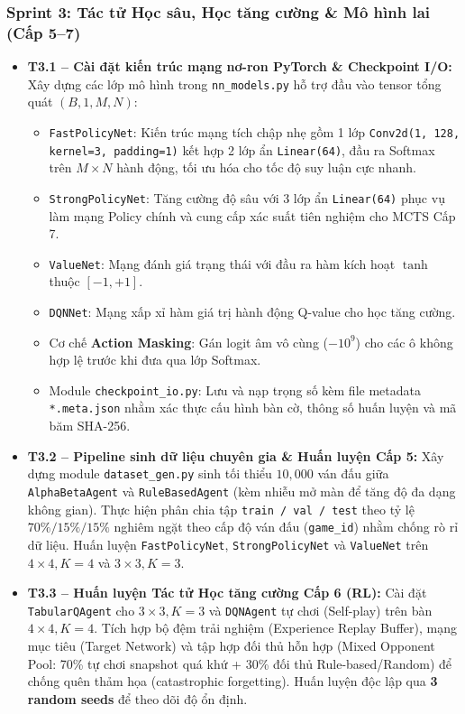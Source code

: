 \documentclass[a4paper,12pt]{report}
\begin{document}
\subsubsection{Sprint 3: Tác tử Học sâu, Học tăng cường \& Mô hình lai (Cấp 5--7)}
\begin{itemize}
    \item \textbf{T3.1 -- Cài đặt kiến trúc mạng nơ-ron PyTorch \& Checkpoint I/O:}
    Xây dựng các lớp mô hình trong \texttt{nn\_models.py} hỗ trợ đầu vào tensor tổng quát $(B, 1, M, N)$:
    \begin{itemize}
        \item \texttt{FastPolicyNet}: Kiến trúc mạng tích chập nhẹ gồm 1 lớp \texttt{Conv2d(1, 128, kernel=3, padding=1)} kết hợp 2 lớp ẩn \texttt{Linear(64)}, đầu ra Softmax trên $M \times N$ hành động, tối ưu hóa cho tốc độ suy luận cực nhanh.
        \item \texttt{StrongPolicyNet}: Tăng cường độ sâu với 3 lớp ẩn \texttt{Linear(64)} phục vụ làm mạng Policy chính và cung cấp xác suất tiên nghiệm cho MCTS Cấp 7.
        \item \texttt{ValueNet}: Mạng đánh giá trạng thái với đầu ra hàm kích hoạt $\tanh$ thuộc $[-1, +1]$.
        \item \texttt{DQNNet}: Mạng xấp xỉ hàm giá trị hành động Q-value cho học tăng cường.
        \item Cơ chế \textbf{Action Masking}: Gán logit âm vô cùng ($-10^9$) cho các ô không hợp lệ trước khi đưa qua lớp Softmax.
        \item Module \texttt{checkpoint\_io.py}: Lưu và nạp trọng số kèm file metadata \texttt{*.meta.json} nhằm xác thực cấu hình bàn cờ, thông số huấn luyện và mã băm SHA-256.
    \end{itemize}
    \item \textbf{T3.2 -- Pipeline sinh dữ liệu chuyên gia \& Huấn luyện Cấp 5:}
    Xây dựng module \texttt{dataset\_gen.py} sinh tối thiểu $10{,}000$ ván đấu giữa \texttt{AlphaBetaAgent} và \texttt{RuleBasedAgent} (kèm nhiễu mở màn để tăng độ đa dạng không gian). Thực hiện phân chia tập \texttt{train / val / test} theo tỷ lệ $70\% / 15\% / 15\%$ nghiêm ngặt theo cấp độ ván đấu (\texttt{game\_id}) nhằm chống rò rỉ dữ liệu. Huấn luyện \texttt{FastPolicyNet}, \texttt{StrongPolicyNet} và \texttt{ValueNet} trên $4 \times 4, K=4$ và $3 \times 3, K=3$.
    \item \textbf{T3.3 -- Huấn luyện Tác tử Học tăng cường Cấp 6 (RL):}
    Cài đặt \texttt{TabularQAgent} cho $3 \times 3, K=3$ và \texttt{DQNAgent} tự chơi (Self-play) trên bàn $4 \times 4, K=4$. Tích hợp bộ đệm trải nghiệm (Experience Replay Buffer), mạng mục tiêu (Target Network) và tập hợp đối thủ hỗn hợp (Mixed Opponent Pool: 70\% tự chơi snapshot quá khứ + 30\% đối thủ Rule-based/Random) để chống quên thảm họa (catastrophic forgetting). Huấn luyện độc lập qua \textbf{3 random seeds} để theo dõi độ ổn định.

\end{itemize}
\end{document}
